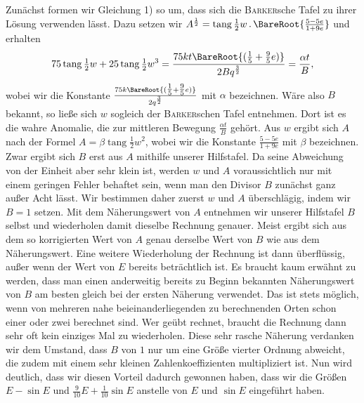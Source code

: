 Zunächst formen wir Gleichung 1) so um, dass sich die \textsc{Barker}sche Tafel zu ihrer Lösung verwenden lässt. Dazu setzen wir $A^{\frac{1}{2}}=\operatorname{tang}\tfrac{1}{2}w\,\mathord{.}\,\BareRoot{\frac{5-5e}{1+9e}}$ und erhalten
\[
75\operatorname{tang}\tfrac{1}{2}w+25\operatorname{tang}\tfrac{1}{2}w^3=\frac{75kt\BareRoot{(\tfrac{1}{5}+\tfrac{9}{5}e)}}{2Bq^{\frac{3}{2}}}=\frac{\alpha t}{B},
\]
wobei wir die Konstante $\frac{75k\BareRoot{(\tfrac{1}{5}+\tfrac{9}{5}e)}}{2q^{\frac{3}{2}}}$ mit $\alpha$ bezeichnen\HistoricalNoteEight{Handschriftliche Bemerkung:] Wenn man \textsc{Burckhardts} Tafel [Connaissance des Temps 1818, siehe auch Bd. VI, S. 596] verwendet, gilt $\frac{\BareRoot{(\tfrac{1}{10}+\tfrac{9}{10}e)}}{q^{\frac{3}{2}}}=\alpha$.}. Wäre also $B$ bekannt, so ließe sich $w$ sogleich der \textsc{Barker}schen Tafel entnehmen. Dort ist es die wahre Anomalie, die zur mittleren Bewegung $\frac{\alpha t}{B}$ gehört. Aus $w$ ergibt sich $A$ nach der Formel $A=\beta\operatorname{tang}\tfrac{1}{2}w^2$, wobei wir die Konstante $\frac{5-5e}{1+9e}$ mit $\beta$ bezeichnen. Zwar ergibt sich $B$ erst aus $A$ mithilfe unserer Hilfstafel. Da seine Abweichung von der Einheit aber sehr klein ist, werden $w$ und $A$ voraussichtlich nur mit einem geringen Fehler behaftet sein, wenn man den Divisor $B$ zunächst ganz außer Acht lässt. Wir bestimmen daher zuerst $w$ und $A$ überschlägig, indem wir $B=1$ setzen. Mit dem Näherungswert von $A$ entnehmen wir unserer Hilfstafel $B$ selbst und wiederholen damit dieselbe Rechnung genauer. Meist ergibt sich aus dem so korrigierten Wert von $A$ genau derselbe Wert von $B$ wie aus dem Näherungswert. Eine weitere Wiederholung der Rechnung ist dann überflüssig, außer wenn der Wert von $E$ bereits beträchtlich ist. Es braucht kaum erwähnt zu werden, dass man einen anderweitig bereits zu Beginn bekannten Näherungswert von $B$ am besten gleich bei der ersten Näherung verwendet. Das ist stets möglich, wenn von mehreren nahe beieinanderliegenden zu berechnenden Orten schon einer oder zwei berechnet sind. Wer geübt rechnet, braucht die Rechnung dann sehr oft kein einziges Mal zu wiederholen. Diese sehr rasche Näherung verdanken wir dem Umstand, dass $B$ von $1$ nur um eine Größe vierter Ordnung abweicht, die zudem mit einem sehr kleinen Zahlenkoeffizienten multipliziert ist. Nun wird deutlich, dass wir diesen Vorteil dadurch gewonnen haben, dass wir die Größen $E-\sin E$ und $\tfrac{9}{10}E+\tfrac{1}{10}\sin E$ anstelle von $E$ und $\sin E$ eingeführt haben.
